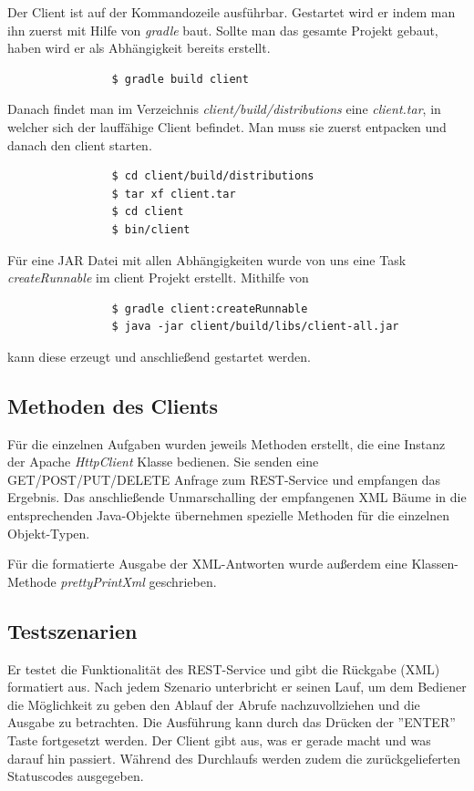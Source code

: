 \documentclass[12pt]{scrartcl}
\begin{document}
			Der Client ist auf der Kommandozeile ausführbar. Gestartet wird er indem man ihn zuerst mit Hilfe von \emph{gradle} baut. Sollte man das gesamte Projekt gebaut, haben wird er als Abhängigkeit bereits erstellt.
			\begin{verbatim}
				$ gradle build client
			\end{verbatim}
			
			Danach findet man im Verzeichnis \emph{client/build/distributions} eine \emph{client.tar}, in welcher sich der lauffähige Client befindet. Man muss sie zuerst entpacken und danach den client starten.
			
			\begin{verbatim}
				$ cd client/build/distributions
				$ tar xf client.tar
				$ cd client
				$ bin/client
			\end{verbatim}
			
			Für eine JAR Datei mit allen Abhängigkeiten wurde von uns eine Task \emph{createRunnable} im client Projekt erstellt. Mithilfe von
			\begin{verbatim}
				$ gradle client:createRunnable
				$ java -jar client/build/libs/client-all.jar
			\end{verbatim}
			
			kann diese erzeugt und anschließend gestartet werden.
		\subsection{Methoden des Clients}
		
			Für die einzelnen Aufgaben wurden jeweils Methoden erstellt, die eine Instanz der Apache \emph{HttpClient} Klasse bedienen. Sie senden eine GET/POST/PUT/DELETE Anfrage zum REST-Service und empfangen das Ergebnis. Das anschließende Unmarschalling der empfangenen XML Bäume in die entsprechenden Java-Objekte übernehmen spezielle Methoden für die einzelnen Objekt-Typen.
			
			Für die formatierte Ausgabe der XML-Antworten wurde außerdem eine Klassen-Methode \emph{prettyPrintXml} geschrieben.
		
		
		\subsection{Testszenarien}
			
			Er testet die Funktionalität des REST-Service und gibt die Rückgabe (XML) formatiert aus. Nach jedem Szenario unterbricht er seinen Lauf, um dem Bediener die Möglichkeit zu geben den Ablauf der Abrufe nachzuvollziehen und die Ausgabe zu betrachten. Die Ausführung kann durch das Drücken der ''ENTER'' Taste fortgesetzt werden. Der Client gibt aus, was er gerade macht und was darauf hin passiert. Während des Durchlaufs werden zudem die zurückgelieferten Statuscodes ausgegeben.
			
\end{document}
